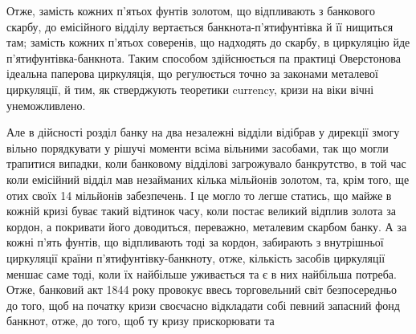 Отже, замість кожних п’ятьох фунтів золотом, що відпливають з банкового
скарбу, до емісійного відділу вертається банкнота-п’ятифунтівка й її
нищиться там; замість кожних п’ятьох соверенів, що надходять до скарбу, в
циркуляцію йде п’ятифунтівка-банкнота. Таким способом здійснюється па практиці
Оверстонова ідеальна паперова циркуляція, що регулюється точно за законами
металевої циркуляції, й тим, як стверджують теоретики currency, кризи на віки
вічні унеможливлено.

Але в дійсності розділ банку на два незалежні відділи відібрав у дирекції
змогу вільно порядкувати у рішучі моменти всіма вільними засобами, так що
могли трапитися випадки, коли банковому відділові загрожувало банкрутство, в
той час коли емісійний відділ мав незайманих кілька мільйонів золотом, та, крім
того, ще отих своїх 14 мільйонів забезпечень. І це могло то легше статись, що
майже в кожній кризі буває такий відтинок часу, коли постає великий відплив
золота за кордон, а покривати його доводиться, переважно, металевим скарбом
банку. А за кожні п’ять фунтів, що відпливають тоді за кордон, забирають з
внутрішньої циркуляції країни п’ятифунтівку-банкноту, отже, кількість засобів
циркуляції меншає саме тоді, коли їх найбільше уживається та є в них найбільша
потреба. Отже, банковий акт 1844 року провокує ввесь торговельний
світ безпосередньо до того, щоб на початку кризи своєчасно відкладати собі певний
запасний фонд банкнот, отже, до того, щоб ту кризу прискорювати та
\parbreak{}  %
